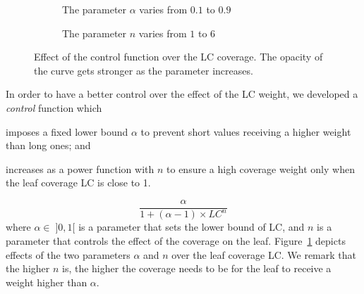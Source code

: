 \begin{figure}
	\centering
	\begin{subfigure}{.45\textwidth}
		\centering
		\caption{The parameter $\alpha$ varies from $0.1$ to $0.9$}
	\end{subfigure}
	\qquad
	\begin{subfigure}{.45\textwidth}
		\centering
		\caption{The parameter $n$ varies from $1$ to $6$}
	\end{subfigure}
	\caption{Effect of the control function over the LC coverage. The opacity of the curve gets stronger as the parameter increases.}
	\label{chap6:ranking:fig:control-function}
\end{figure}

In order to have a better control over the effect of the LC weight, we developed a \emph{control} function which
\begin{inparaenum}[(1)]
	\item imposes a fixed lower bound $\alpha$ to prevent short values receiving a higher weight than long ones; and
	\item increases as a power function with $n$ to ensure a high coverage weight only when the leaf coverage LC is close to 1.
\end{inparaenum}
\begin{equation}
\label{chap6:ranking:eq:lc-norm}
\frac{\alpha}{1+(\alpha-1)\times LC^n}
\end{equation}
where $\alpha \in \; ]0,1[$ is a parameter that sets the lower bound of LC, and $n$ is a parameter that controls the effect of the coverage on the leaf. Figure~\ref{chap6:ranking:fig:control-function} depicts effects of the two parameters $\alpha$ and $n$ over the leaf coverage LC. We remark that the higher $n$ is, the higher the coverage needs to be for the leaf to receive a weight higher than $\alpha$.

